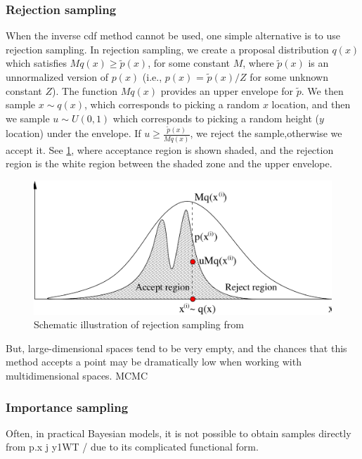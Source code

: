 \subsubsection{Rejection sampling}
When the inverse cdf method cannot be used, one simple alternative is to use rejection sampling. In rejection sampling, we create a proposal distribution $q(x)$ which satisfies $Mq(x) \geq \tilde{p}(x)$, for some constant $M$, where $\tilde{p}(x)$ is an unnormalized version of $p(x)$ (i.e., $p(x)$ = $\tilde{p}(x)/Z$ for some unknown constant $Z$). The function $Mq(x)$ provides an upper envelope for $\tilde{p}$. We then sample $x \sim q(x)$, which corresponds to picking a random $x$ location, and then we sample $u \sim U(0,1)$ which corresponds to picking a random height ($y$ location) under the
envelope. If $u \geq \frac{\tilde{p}(x)}{Mq(x)}$, we reject the sample,otherwise we accept it. See \cref{fig: rejectsampling}, where acceptance region is shown shaded, and the rejection region is the white region between the shaded zone and the upper envelope.
\begin{figure}[htbp]
    \centering
    \includegraphics[width = 140mm]{Figures/figure-rejectionsampling.pdf}
    \caption{Schematic illustration of rejection sampling from \protect\cite{andrieu2003}}
    \label{fig: rejectsampling}
\end{figure}
But, large-dimensional spaces tend to be very empty, and the chances that this method accepts a point may be dramatically low when working with multidimensional spaces. \acrshort{MCMC}

\subsubsection{Importance sampling}

Often, in practical Bayesian models, it is not possible to obtain samples directly from p.x j y1WT / due to its complicated functional form.

